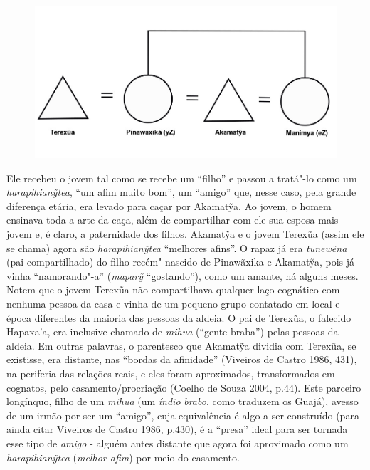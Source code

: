 \begin{figure}[H]
\centering
  \includegraphics[width=\textwidth]{./imgs/Figura_10}
\end{figure}


Ele recebeu o jovem tal como se recebe um ``filho'' e passou a tratá"-lo
como um \emph{harapihianỹtea}, ``um afim muito bom'', um ``amigo'' que,
nesse caso, pela grande diferença etária, era levado para caçar por
Akamatỹa. Ao jovem, o homem ensinava toda a arte da caça, além de
compartilhar com ele sua esposa mais jovem e, é claro, a paternidade dos
filhos. Akamatỹa e o jovem Terexũa (assim ele se chama) agora são
\emph{harapihianỹtea} ``melhores afins''. O rapaz já era \emph{tunewẽna}
(pai compartilhado) do filho recém"-nascido de Pinawãxika e Akamatỹa,
pois já vinha ``namorando"-a'' (\emph{maparỹ} ``gostando''), como um
amante, há alguns meses. Notem que o jovem Terexũa não compartilhava
qualquer laço cognático com nenhuma pessoa da casa e vinha de um pequeno
grupo contatado em local e época diferentes da maioria das pessoas da
aldeia. O pai de Terexũa, o falecido Hapaxa'a, era inclusive chamado de
\emph{mihua} (``gente braba'') pelas pessoas da aldeia. Em outras
palavras, o parentesco que Akamatỹa dividia com Terexũa, se existisse,
era distante, nas ``bordas da afinidade'' (Viveiros de Castro 1986,
431), na periferia das relações reais, e eles foram aproximados,
transformados em cognatos, pelo casamento/procriação (Coelho de Souza
2004, p.44). Este parceiro longínquo, filho de um \emph{mihua} (um
\emph{índio} \emph{brabo}, como traduzem os Guajá), avesso de um irmão
por ser um ``amigo'', cuja equivalência é algo a ser construído (para
ainda citar Viveiros de Castro 1986, p.430), é a ``presa'' ideal para
ser tornada esse tipo de \emph{amigo} - alguém antes distante que agora
foi aproximado como um \emph{harapihianỹtea} (\emph{melhor afim}) por
meio do casamento.

